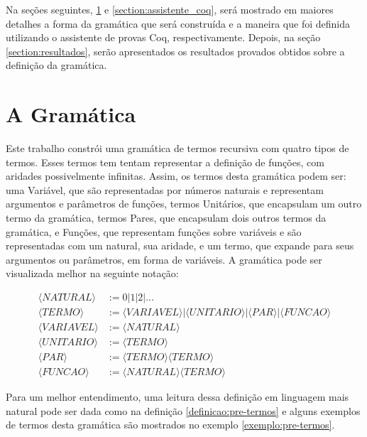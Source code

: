 \documentclass{article}
\begin{document}
Na seções seguintes, \ref{section:a_gramatica} e \ref{section:assistente_coq}, será mostrado em maiores
detalhes a forma da gramática que será construída e a maneira que foi definida utilizando o assistente
de provas Coq, respectivamente. Depois, na seção \ref{section:resultados}, serão apresentados os
resultados provados obtidos sobre a definição da gramática.

\section{A Gramática} %
\label{section:a_gramatica}

Este trabalho constrói uma gramática de termos recursiva com quatro tipos de termos. Esses termos tem
tentam representar a definição de funções, com aridades possivelmente infinitas. Assim, os termos desta
gramática podem ser: uma Variável, que são representadas por números naturais e representam argumentos
e parâmetros de funções, termos Unitários, que encapsulam um outro termo da gramática, termos Pares,
que encapsulam dois outros termos da gramática, e Funções, que representam funções sobre variáveis e
são representadas com um natural, sua aridade, e um termo, que expande para seus argumentos ou
parâmetros, em forma de variáveis. A gramática pode ser visualizada melhor na seguinte notação:

\begin{equation}
	\begin{split}
		\langle NATURAL \rangle  & := 0 | 1 | 2 | ... \\
		\langle TERMO \rangle    & :=
			\langle VARIAVEL \rangle |
			\langle UNITARIO \rangle |
			\langle PAR \rangle |
			\langle FUNCAO \rangle \\
		\langle VARIAVEL \rangle & := \langle NATURAL \rangle \\
		\langle UNITARIO \rangle & := \langle TERMO \rangle \\
		\langle PAR \rangle      & := \langle TERMO \rangle \langle TERMO \rangle \\
		\langle FUNCAO \rangle   & := \langle NATURAL \rangle \langle TERMO \rangle
	\end{split}
\end{equation}

Para um melhor entendimento, uma leitura dessa definição em linguagem mais natural pode ser dada como
na definição \ref{definicao:pre-termos} e alguns exemplos de termos desta gramática são mostrados no
exemplo \ref{exemplo:pre-termos}.
\end{document}

